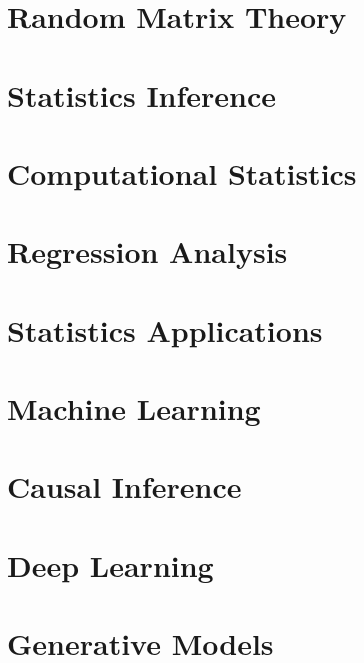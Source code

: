\documentclass[12pt]{prettybook}
\begin{document}
\part{Random Matrix Theory}




\part{Statistics Inference}








\part{Computational Statistics}



\part{Regression Analysis}






\part{Statistics Applications}




\part{Machine Learning}





\part{Causal Inference}


\part{Deep Learning}


\part{Generative Models}

\appendix
\backmatter
\end{document}
